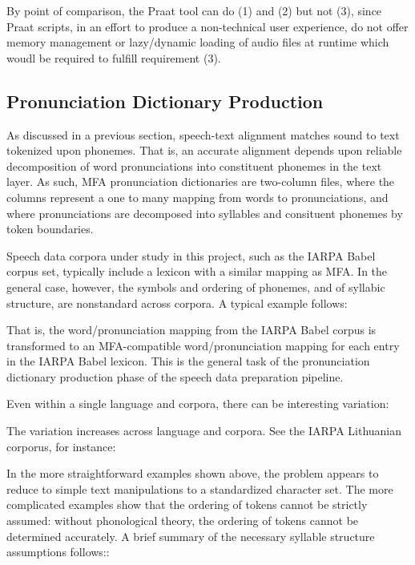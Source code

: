\documentclass[11pt]{article}
\begin{document}
By point of comparison, the Praat tool can do (1) and (2) but not (3), since Praat scripts, in an effort to produce a non-technical user experience, do not offer memory management or lazy/dynamic loading of audio files at runtime which woudl be required to fulfill requirement (3).



\subsection{Pronunciation Dictionary Production}

As discussed in a previous section, speech-text alignment matches sound to text tokenized upon phonemes. That is, an accurate alignment depends upon reliable decomposition of word pronunciations into constituent phonemes in the text layer. As such, MFA pronunciation dictionaries are two-column files, where the columns represent a one to many mapping from words to pronunciations, and where pronunciations are decomposed into syllables and consituent phonemes by token boundaries.

Speech data corpora under study in this project, such as the IARPA Babel corpus set, typically include a lexicon with a similar mapping as MFA. In the general case, however, the symbols and ordering of phonemes, and of syllabic structure, are nonstandard across corpora. A typical example follows:


That is, the word/pronunciation mapping from the IARPA Babel corpus is transformed to an MFA-compatible word/pronunciation mapping for each entry in the IARPA Babel lexicon. This is the general task of the pronunciation dictionary production phase of the speech data preparation pipeline.

Even within a single language and corpora, there can be interesting variation:


The variation increases across language and corpora. See the IARPA Lithuanian corporus, for instance:


In the more straightforward examples shown above, the problem appears to reduce to simple text manipulations to a standardized character set. The more complicated examples show that the ordering of tokens cannot be strictly assumed: without phonological theory, the ordering of tokens cannot be determined accurately. A brief summary of the necessary syllable structure assumptions follows:\cite{fromkin_introduction_2006}:
\end{document}
